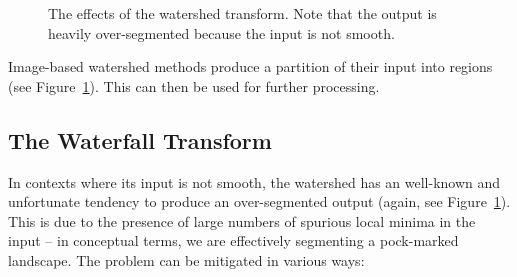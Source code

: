 \documentclass[preprint,a4paper]{elsarticle}
\newenvironment{stusubfig}[1]
{
	\begin{figure}[#1]
	\begin{center}
}
{
	\end{center}
	\end{figure}
}
\begin{document}
\begin{stusubfig}{p}
	\hspace{4mm}%
\caption{The effects of the watershed transform. Note that the output is heavily over-segmented because the input is not smooth.}
\label{fig:segmentation-watershed-adfexample}
\end{stusubfig}

\noindent Image-based watershed methods produce a partition of their input into regions (see Figure~\ref{fig:segmentation-watershed-adfexample}). This can then be used for further processing.

\subsection{The Waterfall Transform}

In contexts where its input is not smooth, the watershed has an well-known and unfortunate tendency to produce an over-segmented output (again, see Figure~\ref{fig:segmentation-watershed-adfexample}). This is due to the presence of large numbers of spurious local minima in the input -- in conceptual terms, we are effectively segmenting a pock-marked landscape. The problem can be mitigated in various ways:
\end{document}
